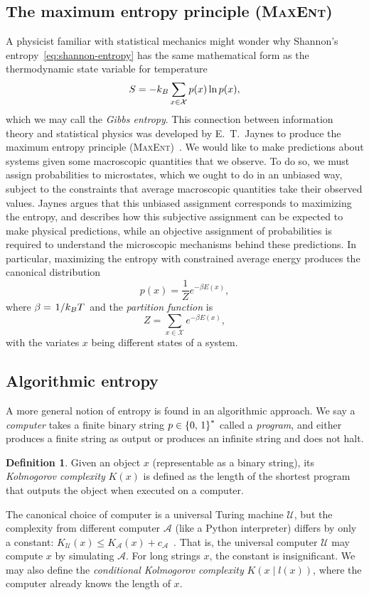 \documentclass[aps,reprint,floatfix]{revtex4-2}
\renewcommand\mathrm\textnormal%
\theoremstyle{plain}
\theoremstyle{definition}
\newtheorem*{defn*}{Definition}
\renewcommand\leq\leqslant%
\renewcommand\ln{\operatorname{\mathrm{ln}}}
\begin{document}
\subsection{The maximum entropy principle (\textsc{MaxEnt})}\label{sec:maxent}

A physicist familiar with statistical mechanics might wonder why Shannon's
entropy~\eqref{eq:shannon-entropy} has the same mathematical form as the
thermodynamic state variable for temperature
\begin{equation}
  S
  = -k_B \sum_{x \in \mathcal{X}} p(x) \ln p(x),
  \label{eq:gibbs-entropy}
\end{equation}
which we may call the \emph{Gibbs entropy}. This connection between information
theory and statistical physics was developed by E.\ T.\ Jaynes to produce the
maximum entropy principle (\textsc{MaxEnt})~\cite{jaynes1957information}. We
would like to make predictions about systems given some macroscopic quantities
that we observe. To do so, we must assign probabilities to microstates, which we
ought to do in an unbiased way, subject to the constraints that average
macroscopic quantities take their observed values. Jaynes argues that this
unbiased assignment corresponds to maximizing the entropy, and describes how
this subjective assignment can be expected to make physical predictions, while
an objective assignment of probabilities is required to understand the
microscopic mechanisms behind these predictions. In particular, maximizing the
entropy with constrained average energy produces the canonical
distribution~\cite{jaynes1957information}
\[
  p(x)
  = \frac{1}{Z}e^{-\beta E(x)},
\]
where $\beta = \flatfrac{1}{k_B T}$ and the \emph{partition function} is
\[
  Z
  = \sum_{x \in \mathcal{X}} e^{-\beta E(x)},
\]
with the variates $x$ being different states of a system.

\subsection{Algorithmic entropy}

A more general notion of entropy is found in an algorithmic approach. We say a
\emph{computer} takes a finite binary string $p \in \qty{0,\, 1}^*$ called a
\emph{program}, and either produces a finite string as output or produces an
infinite string and does not halt.
\begin{defn*}\label{def:kolmogorov}
  Given an object $x$ (representable as a binary string), its \emph{Kolmogorov
  complexity} $K(x)$ is defined as the length of the shortest program that
  outputs the object when executed on a computer.
\end{defn*}
The canonical choice of computer is a universal Turing machine $\mathcal{U}$,
but the complexity from different computer $\mathcal{A}$ (like a Python
interpreter) differs by only a constant: $K_{\mathcal{U}}(x) \leq
K_{\mathcal{A}}(x) + c_{\mathcal{A}}$~\cite[p.~467]{cover}. That is, the
universal computer $\mathcal{U}$ may compute $x$ by simulating $\mathcal{A}$.
For long strings $x$, the constant is insignificant. We may also define the
\emph{conditional Kolmogorov complexity} $K(x \mathbin{|} l(x))$, where the
computer already knows the length of $x$.
\end{document}
